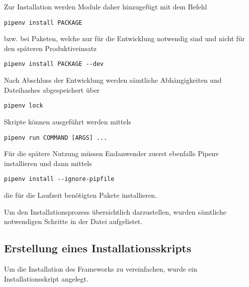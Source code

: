             Zur Installation werden Module daher hinzugefügt mit dem Befehl

            \begin{lstlisting}[caption={Hinzufügen neuer Module in Pipenv}, gobble=16]
                pipenv install PACKAGE
            \end{lstlisting}

            bzw. bei Paketen,
            welche nur für die Entwicklung notwendig sind und
            nicht für den späteren Produktiveinsatz

            \begin{lstlisting}[caption={Hinzufügen neuer Module in Pipenv}, gobble=16]
                pipenv install PACKAGE --dev
            \end{lstlisting}

            Nach Abschluss der Entwicklung werden sämtliche Abhängigkeiten und
            Dateihashes abgespeichert über

            \begin{lstlisting}[caption={Erstellung der Pipfile.lock}, gobble=16]
                pipenv lock
            \end{lstlisting}

            Skripte können ausgeführt werden mittels

            \begin{lstlisting}[caption={Ausführen von Skripten in Pipenv}, gobble=16]
                pipenv run COMMAND [ARGS] ...
            \end{lstlisting}

            Für die spätere Nutzung müssen Endanwender zuerst ebenfalls Pipenv installieren und
            dann mittels

            \begin{lstlisting}[caption={Installation der Pakete für Endanwender}, gobble=16]
                pipenv install --ignore-pipfile
            \end{lstlisting}

            die für die Laufzeit benötigten Pakete installieren.

            Um den Installationsprozess übersichtlich darzustellen,
            wurden sämtliche notwendigen Schritte in der Datei
             aufgelistet.

        \subsection{Erstellung eines Installationsskripts}
            Um die Installation des Frameworks zu vereinfachen,
            wurde ein Installationsskript angelegt.


